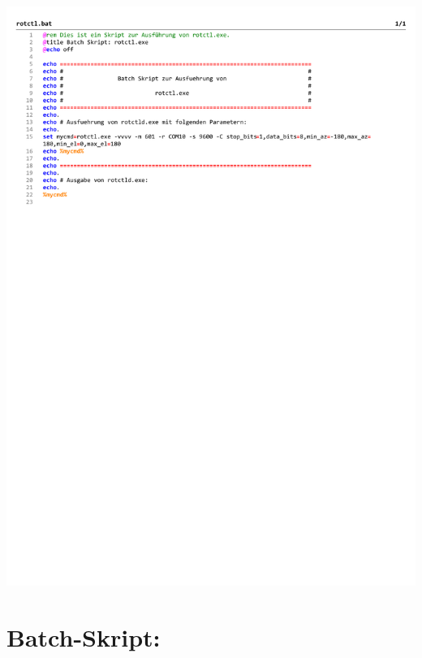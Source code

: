 \begin{center}
	\includegraphics[width=1\textwidth]{./appendicies/rotctl}
\end{center}


\chapter{Batch-Skript: }
\label{chap:rigctlddummybat}

